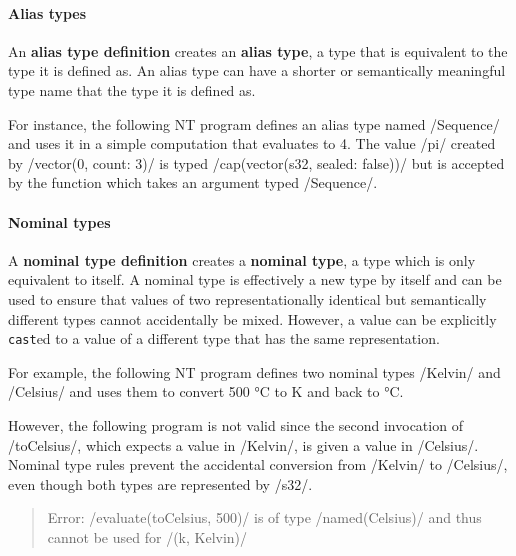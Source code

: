 \documentclass[main.tex]{subfiles}
\begin{document}
\paragraph{Alias types} An \textbf{alias type definition} creates an \textbf{alias type}, a type that is equivalent to the type it is defined as. An alias type can have a shorter or semantically meaningful type name that the type it is defined as.

For instance, the following NT program defines an alias type named \iil/Sequence/ and uses it in a simple computation that evaluates to 4. The value \iil/pi/ created by \iil/vector(0, count: 3)/ is typed \iil/cap(vector(s32, sealed: false))/ but is accepted by the function which takes an argument typed \iil/Sequence/.

\paragraph{Nominal types} A \textbf{nominal type definition} creates a \textbf{nominal type}, a type which is only equivalent to itself. A nominal type is effectively a new type by itself and can be used to ensure that values of two representationally identical but semantically different types cannot accidentally be mixed. However, a value can be explicitly \texttt{cast}ed to a value of a different type that has the same representation.

For example, the following NT program defines two nominal types \iil/Kelvin/ and \iil/Celsius/ and uses them to convert 500 °C to K and back to °C.

However, the following program is not valid since the second invocation of \iil/toCelsius/, which expects a value in \iil/Kelvin/, is given a value in \iil/Celsius/. Nominal type rules prevent the accidental conversion from \iil/Kelvin/ to \iil/Celsius/, even though both types are represented by \iil/s32/.

\begin{quote}
	\ttfamily\footnotesize
	Error: \iil/evaluate(toCelsius, 500)/ is of type \iil/named(Celsius)/ and thus cannot be used for \iil/(k, Kelvin)/
\end{quote}
\end{document}
